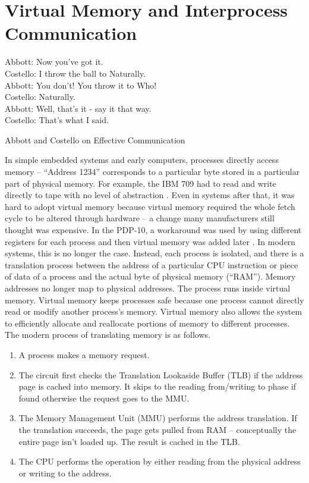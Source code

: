 \chapter{Virtual Memory and Interprocess Communication}
	 
\epigraph{Abbott: Now you've got it. \\
	Costello: I throw the ball to Naturally. \\
	Abbott: You don't! You throw it to Who! \\
	Costello: Naturally. \\
	Abbott: Well, that's it - say it that way. \\
	Costello: That's what I said.}{Abbott and Costello on Effective Communication}
	 
In simple embedded systems and early computers, processes directly access memory -- ``Address 1234'' corresponds to a particular byte stored in a particular part of physical memory.
For example, the IBM 709 had to read and write directly to tape with no level of abstraction \cite[P. 65]{ibm709}.
Even in systems after that, it was hard to adopt virtual memory because virtual memory required the whole fetch cycle to be altered through hardware -- a change many manufacturers still thought was expensive.
In the PDP-10, a workaround was used by using different registers for each process and then virtual memory was added later \cite{ricm}.
In modern systems, this is no longer the case.
Instead, each process is isolated, and there is a translation process between the address of a particular CPU instruction or piece of data of a process and the actual byte of physical memory (``RAM'').
Memory addresses no longer map to physical addresses.
The process runs inside virtual memory.
Virtual memory keeps processes safe because one process cannot directly read or modify another process's memory.
Virtual memory also allows the system to efficiently allocate and reallocate portions of memory to different processes.
The modern process of translating memory is as follows.
	 
\begin{enumerate}
	\item A process makes a memory request.
	\item The circuit first checks the Translation Lookaside Buffer (TLB) if the address page is cached into memory. It skips to the reading from/writing to phase if found otherwise the request goes to the MMU.
	\item The Memory Management Unit (MMU) performs the address translation. If the translation succeeds, the page gets pulled from RAM -- conceptually the entire page isn't loaded up. The result is cached in the TLB.
	\item The CPU performs the operation by either reading from the physical address or writing to the address.
\end{enumerate}
	 
